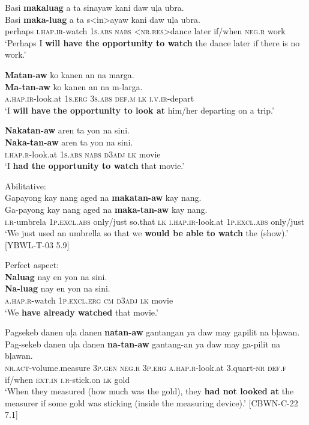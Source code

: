 \newpage
\ea
Basi	\textbf{makaluag}	a	ta	sinayaw	kani	daw	uļa	ubra. \\\smallskip
\gll Basi	\textbf{maka-luag}	a	ta	s<in>ayaw	kani	daw	uļa	ubra. \\
perhaps  \textsc{i.hap.ir}-watch  1\textsc{s.abs}  \textsc{nabs}  \textsc{<nr.res>}dance  later  if/when  \textsc{neg.r} work \\
\glt ‘Perhaps I \textbf{will have the opportunity to watch} the dance later if there is no work.’
\z

\ea
\textbf{Matan-aw}  ko  kanen  an  na  marga. \\\smallskip
\gll \textbf{Ma-tan-aw}  ko  kanen  an  na  m-larga. \\
\textsc{a.hap.ir}-look.at  1\textsc{s.erg}  3\textsc{s.abs}  \textsc{def.m}  \textsc{lk}  \textsc{i.v.ir}-depart \\
\glt ‘I \textbf{will  have the opportunity to look at} him/her departing on a trip.’
\z

\ea
\textbf{Nakatan-aw}  aren  ta  yon  na  sini. \\\smallskip
\gll \textbf{Naka-tan-aw}  aren  ta  yon  na  sini. \\
\textsc{i.hap.r}-look.at  1\textsc{s.abs}  \textsc{nabs}  \textsc{d3adj}  \textsc{lk}  movie \\
\glt ‘I \textbf{had the opportunity to watch} that movie.’
\z

\ea
Abilitative: \\
Gapayong  kay  nang  aged  na  \textbf{makatan-aw}  kay  nang. \\\smallskip
\gll Ga-payong  kay  nang  aged  na  \textbf{maka-tan-aw}  kay  nang. \\
\textsc{i.r}-umbrela  1\textsc{p.excl.abs}  only/just  so.that  \textsc{lk}  \textsc{i.hap.ir}-look.at  1\textsc{p.excl.abs}  only/just \\
\glt ‘We just used an umbrella so that we \textbf{would be able to watch} the (show).’ [YBWL-T-03 5.9]
\z

\ea
Perfect aspect: \\
\textbf{Naluag}  nay  en  yon  na  sini. \\\smallskip
\gll \textbf{Na-luag}  nay  en  yon  na  sini. \\
\textsc{a.hap.r}-watch  1\textsc{p.excl.erg}  \textsc{cm}  \textsc{d3adj}  \textsc{lk}  movie \\
\glt ‘We \textbf{have already watched} that movie.’
\z

\ea
Pagsekeb  danen  uļa  danen  \textbf{natan-aw}  gantangan  ya daw  may  gapilit  na  bļawan. \\\smallskip
\gll Pag-sekeb  danen  uļa  danen  \textbf{na-tan-aw}  gantang-an  ya daw  may  ga-pilit  na  bļawan. \\
\textsc{nr.act}-volume.measure  3\textsc{p.gen}  \textsc{neg.r}  3\textsc{p.erg}  \textsc{a.hap.r}-look.at  3.quart-\textsc{nr}  \textsc{def.f}
if/when  \textsc{ext.in}  \textsc{i.r}-stick.on  \textsc{lk}  gold \\
\glt `When they measured (how much was the gold), they \textbf{had not looked at} the measurer if some gold was sticking (inside the measuring device).’ [CBWN-C-22 7.1]
\z

